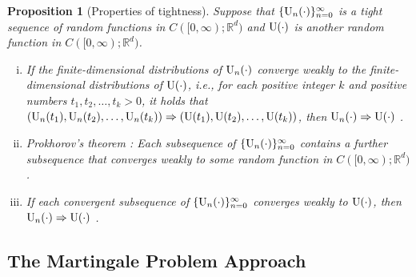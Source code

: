 \documentclass[11pt]{article}
\theoremstyle{plain}
\newtheorem{prop}{Proposition}[section]
\theoremstyle{definition}
\def\RB{{\mathbb R}}
\newcommand{\uu}{{\textnormal{U}}}
\def\weakconverge{\Rightarrow}
\begin{document}
\begin{prop}[Properties of tightness]\label{prop:tight}
	Suppose that $\{ \uu_{n}(\cdot) \}_{n=0}^\infty$ is a tight sequence of random functions in $C([0, \infty); \RB^{d})$ 
	and $\uu(\cdot)$ is another random function in $C([0, \infty); \RB^{d})$. 
	\begin{enumerate}[(i)]
		\item \label{prop:tight:fdd}
		If the finite-dimensional distributions of $ \uu_{n}(\cdot) $ converge weakly to the finite-dimensional distributions of $\uu(\cdot)$, i.e., for each positive integer $k$ and positive numbers $t_1, t_2, \dots, t_k > 0$, it holds that $(\uu_{n}(t_1), \uu_{n}(t_2), \dots, \uu_{n}(t_k)) \weakconverge (\uu(t_1), \uu(t_2), \dots, \uu(t_k))$, then $\uu_{n}(\cdot) \weakconverge \uu(\cdot)$ {\citep[Theorem~3]{whitt1970weak}}.
		
		\item \label{prop:tight:prok} Prokhorov's theorem {\citep[Theorem~5.1]{billingsley2013convergence}}: Each subsequence of $\{ \uu_{n}(\cdot) \}_{n=0}^\infty$ contains a further subsequence that converges weakly to some random function in $C([0, \infty); \RB^{d})$.
		\item \label{prop:tight:converge} If each convergent subsequence of $\{ \uu_{n}(\cdot) \}_{n=0}^\infty$ converges weakly to $\uu(\cdot)$, then $\uu_{n}(\cdot) \weakconverge \uu(\cdot)$ \citep[Corollary on page~59]{billingsley2013convergence}.
	\end{enumerate}
\end{prop}


\subsection{The Martingale Problem Approach}
\label{sec:fclt:prelim:mart}
\end{document}
